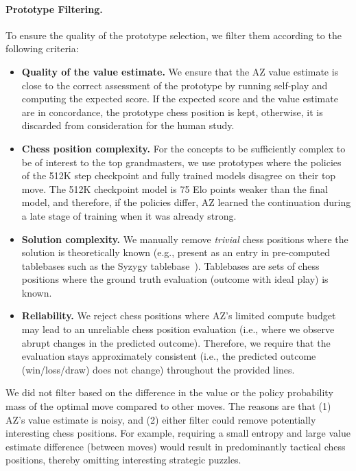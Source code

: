 \documentclass{article}
\begin{document}
\paragraph{Prototype Filtering.}
To ensure the quality of the prototype selection, we filter them  according to the following criteria:
\begin{itemize}
    \item 
    \textbf{Quality of the value estimate.} We ensure that the AZ value estimate is close to the correct assessment of the prototype by running self-play and computing the expected score. If the expected score and the value estimate are in concordance, the prototype chess position is kept, otherwise, it is discarded from consideration for the human study.
    \item 
    \textbf{Chess position complexity.} For the concepts to be sufficiently complex to be of interest to the top grandmasters, we use prototypes where the policies of the 512K step checkpoint and fully trained models disagree on their top move. The 512K checkpoint model is 75 Elo points weaker than the final model, and therefore, if the policies differ, AZ learned the continuation during a late stage of training when it was already strong.
    \item 
    \textbf{Solution complexity.} We manually remove \textit{trivial} chess positions where the solution is theoretically known (e.g., present as an entry in pre-computed tablebases such as the Syzygy tablebase~\citep{tablebase}). Tablebases are sets of chess positions where the ground truth evaluation (outcome with ideal play) is known.
    \item \textbf{Reliability.} We reject chess positions where AZ's limited compute budget may lead to an unreliable chess position evaluation (i.e., where we observe abrupt changes in the predicted outcome). Therefore, we require that the evaluation stays approximately consistent (i.e., the predicted outcome (win/loss/draw) does not change) throughout the provided lines. 
\end{itemize}
We did not filter based on the difference in the value or the policy probability mass of the optimal move compared to other moves. 
The reasons are that (1) AZ's value estimate is noisy, and (2) either filter could remove potentially interesting chess positions. For example, requiring a small entropy and large value estimate difference (between moves) would result in predominantly tactical chess positions, thereby omitting interesting strategic puzzles.
\end{document}
